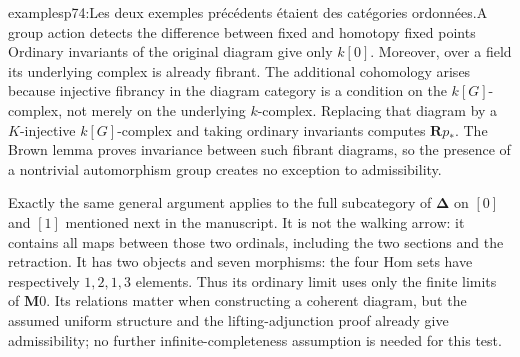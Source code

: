 \begin{dcomment}{examples}{p74:Les deux exemples précédents étaient des catégories ordonnées.}{A group action detects the difference between fixed and homotopy fixed points}
Ordinary invariants of the original diagram give only $k[0]$. Moreover, over a field its underlying complex is already fibrant. The additional cohomology arises because injective fibrancy in the diagram category is a condition on the $k[G]$-complex, not merely on the underlying $k$-complex. Replacing that diagram by a $K$-injective $k[G]$-complex and taking ordinary invariants computes $\mathbf Rp_*$. The Brown lemma proves invariance between such fibrant diagrams, so the presence of a nontrivial automorphism group creates no exception to admissibility.

Exactly the same general argument applies to the full subcategory of $\boldsymbol\Delta$ on $[0]$ and $[1]$ mentioned next in the manuscript. It is not the walking arrow: it contains all maps between those two ordinals, including the two sections and the retraction. It has two objects and seven morphisms: the four Hom sets have respectively $1,2,1,3$ elements. Thus its ordinary limit uses only the finite limits of $\mathbf M0$. Its relations matter when constructing a coherent diagram, but the assumed uniform structure and the lifting-adjunction proof already give admissibility; no further infinite-completeness assumption is needed for this test.
\end{dcomment}


